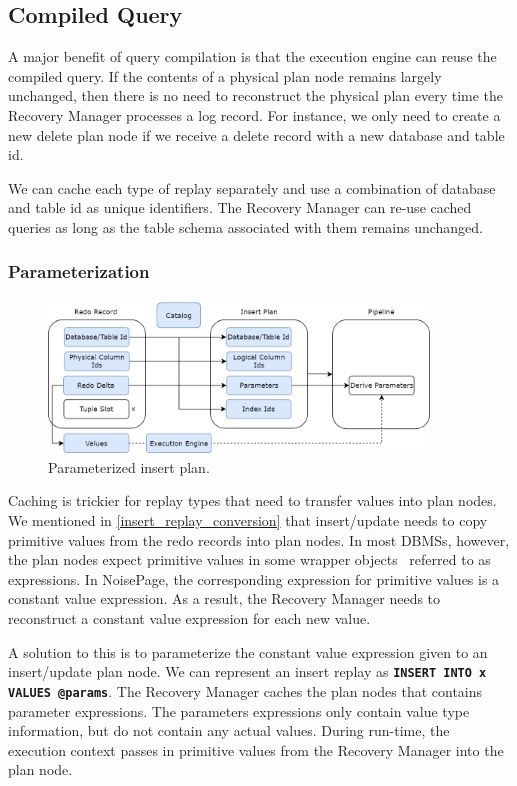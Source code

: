 \documentclass[12pt]{cmuthesis}
\newcommand{\dbSQL}[1]{\texttt{\textbf{#1}}\xspace}
\begin{document}
\subsection{Compiled Query}
A major benefit of query compilation is that the execution engine can reuse the compiled query. If the contents of a physical plan node remains largely unchanged, then there is no need to reconstruct the physical plan every time the Recovery Manager processes a log record. For instance, we only need to create a new delete plan node if we receive a delete record with a new database and table id.

We can cache each type of replay separately and use a combination of database and table id as unique identifiers. The Recovery Manager can re-use cached queries as long as the table schema associated with them remains unchanged.

\subsubsection{Parameterization}
\begin{figure}[t!]
\centering
\includegraphics[width=0.9\textwidth]{images/ParameterizedRedoRecord.png}
\caption{Parameterized insert plan.}
\label{fig:parameterization}
\end{figure}

Caching is trickier for replay types that need to transfer values into plan nodes. We mentioned in \cref{insert_replay_conversion} that insert/update needs to copy primitive values from the redo records into plan nodes. In most DBMSs, however, the plan nodes expect primitive values in some wrapper objects~\cite{volcano, kersten18} referred to as expressions. In NoisePage, the corresponding expression for primitive values is a constant value expression. As a result, the Recovery Manager needs to reconstruct a constant value expression for each new value.

A solution to this is to parameterize the constant value expression given to an insert/update plan node. We can represent an insert replay as \dbSQL{INSERT INTO x VALUES @params}. The Recovery Manager caches the plan nodes that contains parameter expressions. The parameters expressions only contain value type information, but do not contain any actual values. During run-time, the execution context passes in primitive values from the Recovery Manager into the plan node.
\end{document}
